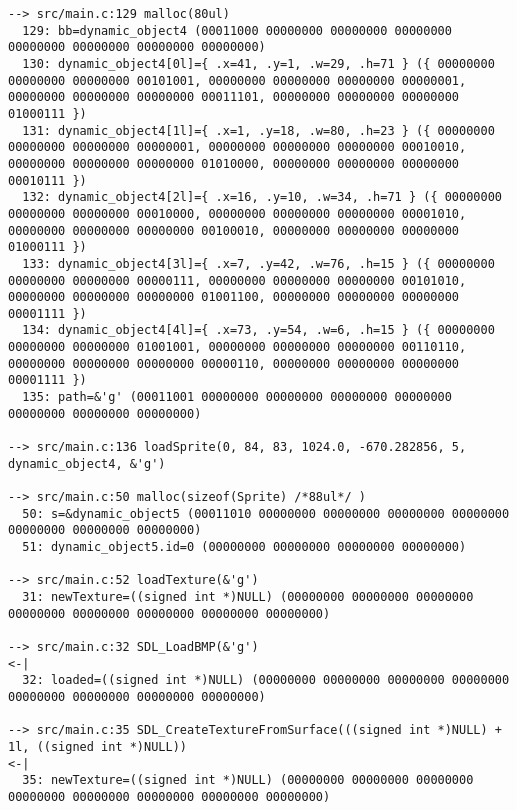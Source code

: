 \begin{verbatim}
--> src/main.c:129 malloc(80ul)
  129: bb=dynamic_object4 (00011000 00000000 00000000 00000000 00000000 00000000 00000000 00000000)
  130: dynamic_object4[0l]={ .x=41, .y=1, .w=29, .h=71 } ({ 00000000 00000000 00000000 00101001, 00000000 00000000 00000000 00000001, 00000000 00000000 00000000 00011101, 00000000 00000000 00000000 01000111 })
  131: dynamic_object4[1l]={ .x=1, .y=18, .w=80, .h=23 } ({ 00000000 00000000 00000000 00000001, 00000000 00000000 00000000 00010010, 00000000 00000000 00000000 01010000, 00000000 00000000 00000000 00010111 })
  132: dynamic_object4[2l]={ .x=16, .y=10, .w=34, .h=71 } ({ 00000000 00000000 00000000 00010000, 00000000 00000000 00000000 00001010, 00000000 00000000 00000000 00100010, 00000000 00000000 00000000 01000111 })
  133: dynamic_object4[3l]={ .x=7, .y=42, .w=76, .h=15 } ({ 00000000 00000000 00000000 00000111, 00000000 00000000 00000000 00101010, 00000000 00000000 00000000 01001100, 00000000 00000000 00000000 00001111 })
  134: dynamic_object4[4l]={ .x=73, .y=54, .w=6, .h=15 } ({ 00000000 00000000 00000000 01001001, 00000000 00000000 00000000 00110110, 00000000 00000000 00000000 00000110, 00000000 00000000 00000000 00001111 })
  135: path=&'g' (00011001 00000000 00000000 00000000 00000000 00000000 00000000 00000000)

--> src/main.c:136 loadSprite(0, 84, 83, 1024.0, -670.282856, 5, dynamic_object4, &'g')

--> src/main.c:50 malloc(sizeof(Sprite) /*88ul*/ )
  50: s=&dynamic_object5 (00011010 00000000 00000000 00000000 00000000 00000000 00000000 00000000)
  51: dynamic_object5.id=0 (00000000 00000000 00000000 00000000)

--> src/main.c:52 loadTexture(&'g')
  31: newTexture=((signed int *)NULL) (00000000 00000000 00000000 00000000 00000000 00000000 00000000 00000000)

--> src/main.c:32 SDL_LoadBMP(&'g')
<-|
  32: loaded=((signed int *)NULL) (00000000 00000000 00000000 00000000 00000000 00000000 00000000 00000000)

--> src/main.c:35 SDL_CreateTextureFromSurface(((signed int *)NULL) + 1l, ((signed int *)NULL))
<-|
  35: newTexture=((signed int *)NULL) (00000000 00000000 00000000 00000000 00000000 00000000 00000000 00000000)


\end{verbatim}
